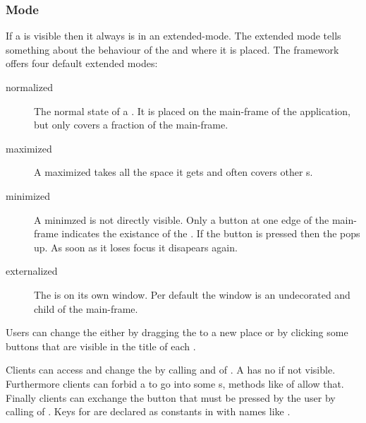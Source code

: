 

\subsubsection{Mode}
If a  is visible then it always is in an extended-mode. The extended mode tells something about the behaviour of the  and where it is placed. The framework offers four default extended modes:
\begin{description}
 \item[normalized] The normal state of a . It is placed on the main-frame of the application, but only covers a fraction of the main-frame.
 \item[maximized] A maximized  takes all the space it gets and often covers other s.
 \item[minimized] A minimzed  is not directly visible. Only a button at one edge of the main-frame indicates the existance of the . If the button is pressed then the  pops up. As soon as it loses focus it disapears again.
 \item[externalized] The  is on its own window. Per default the window is an undecorated  and child of the main-frame.
\end{description}

Users can change the  either by dragging the  to a new place or by clicking some buttons that are visible in the title of each . 

Clients can access and change the  by calling \linebreak {} and  of . A  has no  if not visible. Furthermore clients can forbid a  to go into some s, methods like  of  allow that. Finally clients can exchange the button that must be pressed by the user by calling  of . Keys for  are declared as  constants in  with names like .

